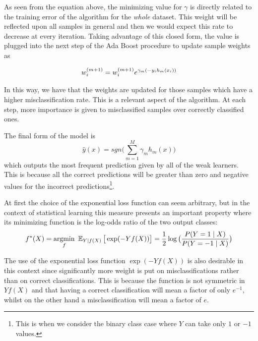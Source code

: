 As seen from the equation above, the minimizing value for $\gamma$ is directly related to the training error of the algorithm for the \textit{whole} dataset.
This weight will be reflected upon all samples in general and then we would expect this rate to decrease at every iteration.
Taking advantage of this closed form, the value is plugged into the next step of the Ada Boost procedure to update sample weights as

\begin{equation}
w_i^{(m+1)} =  w_i^{(m+1)} e^{\gamma_m(-y_i h_m(x_i))} \\
\end{equation}

In this way, we have that the weights are updated for those samples which have a higher misclassification rate.
This is a relevant aspect of the algorithm.
At each step, more importance is given to misclassified samples over correctly classified ones.



The final form of the model is
\begin{equation}
 \hat{y}(x) = sgn\big( \sum_{m=1}^{M} \gamma_m h_m(x) \big)
\end{equation}
  which outputs the most frequent prediction given by all of the weak learners.
  This is because all the correct predictions will be greater than zero and negative values for the incorrect predictions\footnote{This is when we consider the binary class case where $Y$ can take only $1$ or $-1$ values.}.

At first the choice of the exponential loss function can seem arbitrary, but in the context of statistical learning this measure presents an important property where its minimizing function is the log-odds ratio of the two output classes:
\begin{equation}
f^*(X) = \underset{f}{\mathrm{argmin}} \ \Expect_{Y | f(X)}\big[ \exp(-Yf(X)) \big] = \frac{1}{2}\log\big( \frac{ P(Y=1 \mid X) }{ P(Y=-1 \mid X) } \big)
\end{equation}


The use of the exponential loss function $\exp(-Yf(X))$ is also desirable in this context since significantly more weight is put on misclassifications rather than on correct classifications.
This is because the function is not symmetric in $Yf(X)$ and that having a correct classification will mean a factor of only $e^{-1}$, whilst on the other hand a misclassification will mean a factor of $e$.

